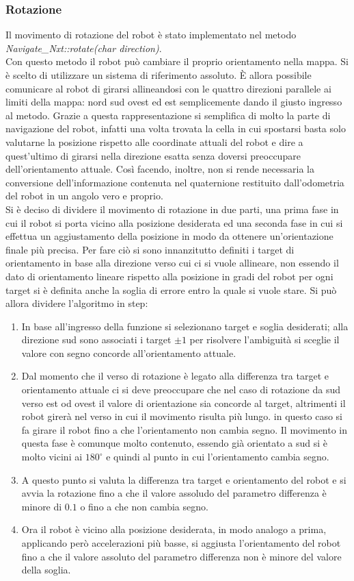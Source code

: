 \documentclass[english]{article}
\newcommand*{\eacc}{\MakeUppercase{è }}
\begin{document}
\subsubsection{Rotazione}
Il movimento di rotazione del robot è stato implementato nel metodo \textit{Navigate\_Nxt::rotate(char direction)}.\\
Con questo metodo il robot può cambiare il proprio orientamento nella mappa. Si è scelto di utilizzare un sistema di riferimento assoluto. \eacc allora possibile comunicare al robot di girarsi allineandosi con le quattro direzioni parallele ai limiti della mappa: nord sud ovest ed est semplicemente dando il giusto ingresso al metodo. Grazie a questa rappresentazione si semplifica di molto la parte di navigazione del robot, infatti una volta trovata la cella in cui spostarsi basta solo valutarne la posizione rispetto alle coordinate attuali del robot e dire a quest'ultimo di girarsi nella direzione esatta senza doversi preoccupare dell'orientamento attuale. Così facendo, inoltre, non si rende necessaria la conversione dell'informazione contenuta nel quaternione restituito dall'odometria del robot in un angolo vero e proprio.\\
Si è deciso di dividere il movimento di rotazione in due parti, una prima fase in cui il robot si porta vicino alla posizione desiderata ed una seconda fase in cui si effettua un aggiustamento della posizione in modo da ottenere un'orientazione finale più precisa. Per fare ciò si sono innanzitutto definiti i target di orientamento in base alla direzione verso cui ci si vuole allineare, non essendo il dato di orientamento lineare rispetto alla posizione in gradi del robot per ogni target si è definita anche la soglia di errore entro la quale si vuole stare.
Si può allora dividere l'algoritmo in step:
\begin{enumerate}
\item In base all'ingresso della funzione si selezionano target e soglia desiderati; alla direzione sud sono associati i target $\pm 1$ per risolvere l'ambiguità si sceglie il valore con segno concorde all'orientamento attuale. 
\item Dal momento che il verso di rotazione è legato alla differenza tra target e orientamento attuale ci si deve preoccupare che nel caso di rotazione da sud verso est od ovest il valore di orientazione sia concorde al target, altrimenti il robot girerà nel verso in cui il movimento risulta più lungo. in questo caso si fa girare il robot fino a che l'orientamento non cambia segno. Il movimento in questa fase è comunque molto contenuto, essendo già orientato a sud si è molto vicini ai $180^{\circ}$ e quindi al punto in cui l'orientamento cambia segno.
\item A questo punto si valuta la differenza tra target e orientamento del robot e si avvia la rotazione fino a che il valore assoludo del parametro differenza è minore di $0.1$ o fino a che non cambia segno.
\item Ora il robot è vicino alla posizione desiderata, in modo analogo a prima, applicando però accelerazioni più basse, si aggiusta l'orientamento del robot fino a che il valore assoluto del parametro differenza non è minore del valore della soglia.
\end{enumerate}
\end{document}
